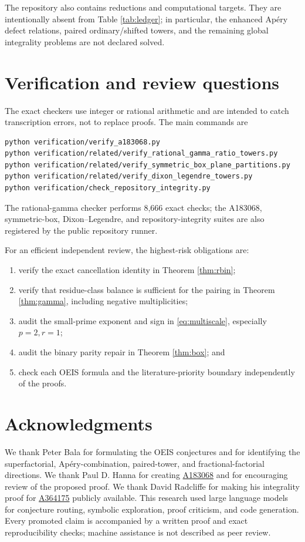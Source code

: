 \documentclass[11pt]{article}
\theoremstyle{definition}
\newcommand{\OEIS}[1]{\href{https://oeis.org/#1}{#1}}
\begin{document}
The repository also contains reductions and computational targets.  They
are intentionally absent from Table \ref{tab:ledger}; in particular, the
enhanced Ap\'ery defect relations, paired ordinary/shifted towers, and the
remaining global integrality problems are not declared solved.

\section{Verification and review questions}

The exact checkers use integer or rational arithmetic and are intended to
catch transcription errors, not to replace proofs.  The main commands are
\begin{verbatim}
python verification/verify_a183068.py
python verification/related/verify_rational_gamma_ratio_towers.py
python verification/related/verify_symmetric_box_plane_partitions.py
python verification/related/verify_dixon_legendre_towers.py
python verification/check_repository_integrity.py
\end{verbatim}
The rational-gamma checker performs 8,666 exact checks; the A183068,
symmetric-box, Dixon--Legendre, and repository-integrity suites are also
registered by the public repository runner.

For an efficient independent review, the highest-risk obligations are:
\begin{enumerate}
\item verify the exact cancellation identity in Theorem \ref{thm:rbin};
\item verify that residue-class balance is sufficient for the pairing in
      Theorem \ref{thm:gamma}, including negative multiplicities;
\item audit the small-prime exponent and sign in
      \eqref{eq:multiscale}, especially $p=2,r=1$;
\item audit the binary parity repair in Theorem \ref{thm:box}; and
\item check each OEIS formula and the literature-priority boundary
      independently of the proofs.
\end{enumerate}

\section*{Acknowledgments}

We thank Peter Bala for formulating the OEIS conjectures and for identifying
the superfactorial, Ap\'ery-combination, paired-tower, and
fractional-factorial directions.  We thank Paul D. Hanna for creating
\OEIS{A183068} and for encouraging review of the proposed proof.  We thank
David Radcliffe for making his integrality proof for \OEIS{A364175}
publicly available.  This research used large language models for
conjecture routing, symbolic exploration, proof criticism, and code
generation.  Every promoted claim is accompanied by a written proof and
exact reproducibility checks; machine assistance is not described as peer
review.
\end{document}
